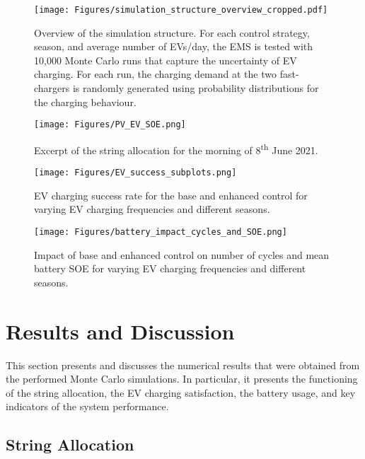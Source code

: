 \documentclass[final,5p,times,twocolumn]{elsarticle}
\begin{document}
\begin{figure}[h]
    \centering
    \texttt{[image: Figures/simulation\_structure\_overview\_cropped.pdf]}
    \caption{Overview of the simulation structure. For each control strategy, season, and average number of EVs/day, the EMS is tested with 10,000 Monte Carlo runs that capture the uncertainty of EV charging. For each run, the charging demand at the two fast-chargers is randomly generated using probability distributions for the charging behaviour.}
    \label{fig:sim_structure}
\end{figure}


\begin{figure}[b!]
    \centering
    \texttt{[image: Figures/PV\_EV\_SOE.png]}
    \caption{Excerpt of the string allocation for the morning of 8\textsuperscript{th} June 2021.}
    \label{fig:string_allocation}
\end{figure}

\begin{figure*}[t!]
    \centering
    \texttt{[image: Figures/EV\_success\_subplots.png]}
    \caption{EV charging success rate for the base and enhanced control for varying EV charging frequencies and different seasons.}\label{fig:ev_success}
\end{figure*} 

\begin{figure*}[b!]
    \centering
    \texttt{[image: Figures/battery\_impact\_cycles\_and\_SOE.png]}
    \caption{Impact of base and enhanced control on number of cycles and mean battery SOE for varying EV charging frequencies and different seasons.}
    \label{fig:battery_impact}
\end{figure*}

\section{Results and Discussion}\label{sec:results}

This section presents and discusses the numerical results that were obtained from the performed Monte Carlo simulations. In particular, it presents the functioning of the string allocation, the EV charging satisfaction, the battery usage, and key indicators of the system performance.

\subsection{String Allocation}
\end{document}
